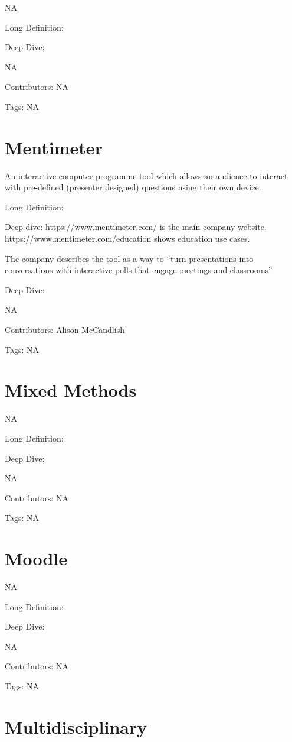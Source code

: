 \documentclass[
  letterpaper,
  DIV=11,
  numbers=noendperiod]{scrreprt}
\begin{document}
NA

Long Definition:

Deep Dive:

NA

Contributors: NA

Tags: NA

\section{Mentimeter}\label{mentimeter}

An interactive computer programme tool which allows an audience to
interact with pre-defined (presenter designed) questions using their own
device.

Long Definition:

Deep dive: https://www.mentimeter.com/ is the main company website.
https://www.mentimeter.com/education shows education use cases.

The company describes the tool as a way to ``turn presentations into
conversations with interactive polls that engage meetings and
classrooms''

Deep Dive:

NA

Contributors: Alison McCandlish

Tags: NA

\section{Mixed Methods}\label{mixed-methods}

NA

Long Definition:

Deep Dive:

NA

Contributors: NA

Tags: NA

\section{Moodle}\label{moodle}

NA

Long Definition:

Deep Dive:

NA

Contributors: NA

Tags: NA

\section{Multidisciplinary}\label{multidisciplinary}
\end{document}
